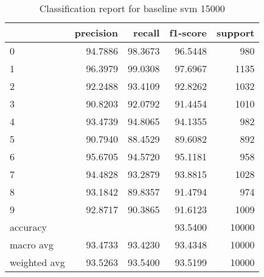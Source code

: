 \begin{table}[htb!]
\centering
\begin{tabular}{lrrrr}
\toprule
 & precision & recall & f1-score & support \\
\midrule
0 & 94.7886 & 98.3673 & 96.5448 & 980 \\
1 & 96.3979 & 99.0308 & 97.6967 & 1135 \\
2 & 92.2488 & 93.4109 & 92.8262 & 1032 \\
3 & 90.8203 & 92.0792 & 91.4454 & 1010 \\
4 & 93.4739 & 94.8065 & 94.1355 & 982 \\
5 & 90.7940 & 88.4529 & 89.6082 & 892 \\
6 & 95.6705 & 94.5720 & 95.1181 & 958 \\
7 & 94.4828 & 93.2879 & 93.8815 & 1028 \\
8 & 93.1842 & 89.8357 & 91.4794 & 974 \\
9 & 92.8717 & 90.3865 & 91.6123 & 1009 \\
accuracy & & & 93.5400 & 10000 \\
macro avg & 93.4733 & 93.4230 & 93.4348 & 10000 \\
weighted avg & 93.5263 & 93.5400 & 93.5199 & 10000 \\
\bottomrule
\end{tabular}
\caption{Classification report for baseline svm 15000}
\label{tab:classification-report-baseline_svm_15000}
\end{table}
